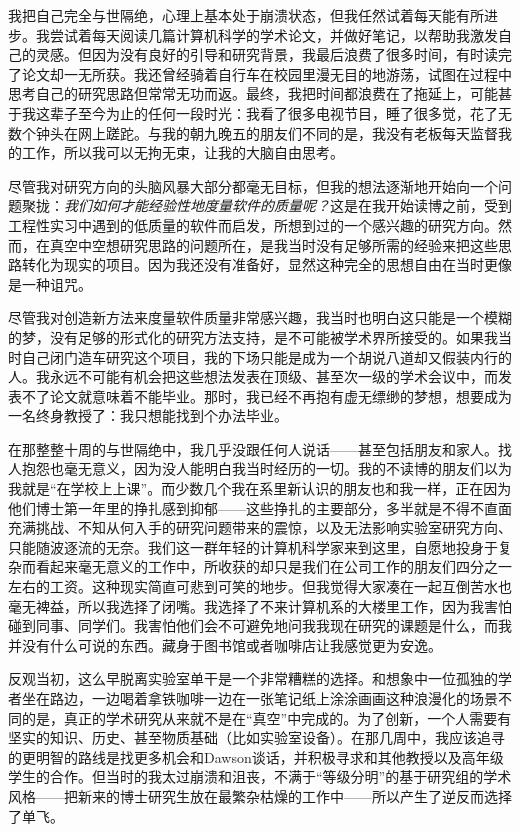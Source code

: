 \documentclass[letter,12pt]{book}
\begin{document}
\begin{CJK}{UTF8}{gbsn}
我把自己完全与世隔绝，心理上基本处于崩溃状态，但我任然试着每天能有所进步。我尝试着每天阅读几篇计算机科学的学术论文，并做好笔记，以帮助我激发自己的灵感。但因为没有良好的引导和研究背景，我最后浪费了很多时间，有时读完了论文却一无所获。我还曾经骑着自行车在校园里漫无目的地游荡，试图在过程中思考自己的研究思路但常常无功而返。最终，我把时间都浪费在了拖延上，可能甚于我这辈子至今为止的任何一段时光：我看了很多电视节目，睡了很多觉，花了无数个钟头在网上蹉跎。与我的朝九晚五的朋友们不同的是，我没有老板每天监督我的工作，所以我可以无拘无束，让我的大脑自由思考。

尽管我对研究方向的头脑风暴大部分都毫无目标，但我的想法逐渐地开始向一个问题聚拢：\emph{我们如何才能经验性地度量软件的质量呢？}这是在我开始读博之前，受到工程性实习中遇到的低质量的软件而启发，所想到过的一个感兴趣的研究方向。然而，在真空中空想研究思路的问题所在，是我当时没有足够所需的经验来把这些思路转化为现实的项目。因为我还没有准备好，显然这种完全的思想自由在当时更像是一种诅咒。

尽管我对创造新方法来度量软件质量非常感兴趣，我当时也明白这只能是一个模糊的梦，没有足够的形式化的研究方法支持，是不可能被学术界所接受的。如果我当时自己闭门造车研究这个项目，我的下场只能是成为一个胡说八道却又假装内行的人。我永远不可能有机会把这些想法发表在顶级、甚至次一级的学术会议中，而发表不了论文就意味着不能毕业。那时，我已经不再抱有虚无缥缈的梦想，想要成为一名终身教授了：我只想能找到个办法毕业。

在那整整十周的与世隔绝中，我几乎没跟任何人说话——甚至包括朋友和家人。找人抱怨也毫无意义，因为没人能明白我当时经历的一切。我的不读博的朋友们以为我就是“在学校上上课”。而少数几个我在系里新认识的朋友也和我一样，正在因为他们博士第一年里的挣扎感到抑郁——这些挣扎的主要部分，多半就是不得不直面充满挑战、不知从何入手的研究问题带来的震惊，以及无法影响实验室研究方向、只能随波逐流的无奈。我们这一群年轻的计算机科学家来到这里，自愿地投身于复杂而看起来毫无意义的工作中，所收获的却只是我们在公司工作的朋友们四分之一左右的工资。这种现实简直可悲到可笑的地步。但我觉得大家凑在一起互倒苦水也毫无裨益，所以我选择了闭嘴。我选择了不来计算机系的大楼里工作，因为我害怕碰到同事、同学们。我害怕他们会不可避免地问我我现在研究的课题是什么，而我并没有什么可说的东西。藏身于图书馆或者咖啡店让我感觉更为安逸。

反观当初，这么早脱离实验室单干是一个非常糟糕的选择。和想象中一位孤独的学者坐在路边，一边喝着拿铁咖啡一边在一张笔记纸上涂涂画画这种浪漫化的场景不同的是，真正的学术研究从来就不是在“真空”中完成的。为了创新，一个人需要有坚实的知识、历史、甚至物质基础（比如实验室设备）。在那几周中，我应该追寻的更明智的路线是找更多机会和Dawson谈话，并积极寻求和其他教授以及高年级学生的合作。但当时的我太过崩溃和沮丧，不满于“等级分明”的基于研究组的学术风格——把新来的博士研究生放在最繁杂枯燥的工作中——所以产生了逆反而选择了单飞。


\end{CJK}
\end{document}
